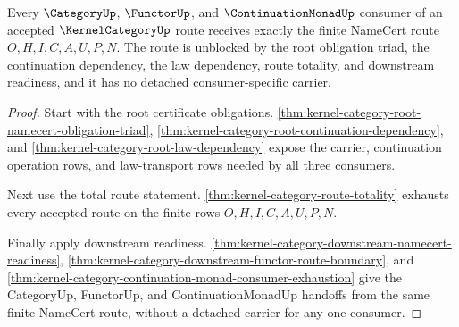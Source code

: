 \begin{theorem}
\label{thm:kernel-category-root-downstream-unblock}
Every $\CategoryUp$, $\FunctorUp$, and $\ContinuationMonadUp$ consumer of an accepted $\KernelCategoryUp$ route receives exactly the finite NameCert route $O,H,I,C,A,U,P,N$. The route is unblocked by the root obligation triad, the continuation dependency, the law dependency, route totality, and downstream readiness, and it has no detached consumer-specific carrier.
\end{theorem}
\begin{proof}
Start with the root certificate obligations. \autoref{thm:kernel-category-root-namecert-obligation-triad}, \autoref{thm:kernel-category-root-continuation-dependency}, and \autoref{thm:kernel-category-root-law-dependency} expose the carrier, continuation operation rows, and law-transport rows needed by all three consumers.

Next use the total route statement. \autoref{thm:kernel-category-route-totality} exhausts every accepted route on the finite rows $O,H,I,C,A,U,P,N$.

Finally apply downstream readiness. \autoref{thm:kernel-category-downstream-namecert-readiness}, \autoref{thm:kernel-category-downstream-functor-route-boundary}, and \autoref{thm:kernel-category-continuation-monad-consumer-exhaustion} give the CategoryUp, FunctorUp, and ContinuationMonadUp handoffs from the same finite NameCert route, without a detached carrier for any one consumer.
\end{proof}

